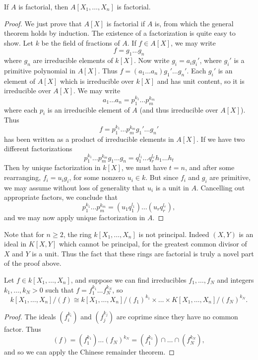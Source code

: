 \begin{corollary}
    If $A$ is factorial, then $A[X_1, \dots, X_n]$ is factorial.
\end{corollary}
\begin{proof}
    We just prove that $A[X]$ is factorial if $A$ is, from which the general theorem holds by induction. The existence of a factorization is quite easy to show. Let $k$ be the field of fractions of $A$. If $f \in A[X]$, we may write
    \[ f = g_1 \dots g_n \]
    where $g_n$ are irreducible elements of $k[X]$. Now write $g_i = a_i g_i'$, where $g_i'$ is a primitive polynomial in $A[X]$. Thus $f = (a_1 \dots a_n) g_1' \dots g_n'$. Each $g_i'$ is an element of $A[X]$ which is irreducible over $k[X]$ and has unit content, so it is irreducible over $A[X]$. We may write
    \[ a_1 \dots a_n = p_1^{k_1} \dots p_m^{k_m} \]
    where each $p_i$ is an irreducible element of $A$ (and thus irreducible over $A[X]$). Thus
    \[ f = p_1^{k_1} \dots p_m^{k_m} g_1' \dots g_n' \]
    has been written as a product of irreducible elements in $A[X]$. If we have two different factorizations
    \[ p_1^{k_1} \dots p_m^{k_m}  g_1 \dots g_n = q_1^{l_1} \dots q_r^{l_r} h_1 \dots h_t \]
    Then by unique factorization in $k[X]$, we must have $t = n$, and after some rearranging, $f_i = u_i g_i$, for some nonzero $u_i \in k$. But since $f_i$ and $g_i$ are primitive, we may assume without loss of generality that $u_i$ is a unit in $A$. Cancelling out appropriate factors, we conclude that
    \[ p_1^{k_1} \dots p_m^{k_m} = (u_1 q_1^{l_1}) \dots (u_r q_r^{l_r}), \]
    and we may now apply unique factorization in $A$.
\end{proof}

Note that for $n \geq 2$, the ring $k[X_1, \dots, X_n]$ is not principal. Indeed $(X,Y)$ is an ideal in $K[X,Y]$ which cannot be principal, for the greatest common divisor of $X$ and $Y$ is a unit. Thus the fact that these rings are factorial is truly a novel part of the proof above.

\begin{corollary}
    Let $f \in k[X_1, \dots, X_n]$, and suppose we can find irreducibles $f_1, \dots, f_N$ and integers $k_1, \dots, k_N > 0$ such that $f = f_1^{k_1} \dots f_N^{k_N}$, so
    \[ k[X_1,\dots,X_n] / (f) \cong k[X_1,\dots,X_n] / (f_1)^{k_1} \times \dots \times K[X_1,\dots,X_n] / (f_N)^{k_N}. \]
\end{corollary}
\begin{proof}
    The ideals $(f_i^{k_i})$ and $(f_j^{k_j})$ are coprime since they have no common factor. Thus
    \[ (f) = (f_1^{k_1}) \dots (f_N)^{k_N} = (f_1^{k_1}) \cap \dots \cap (f_N^{k_N}), \]
    and so we can apply the Chinese remainder theorem.
\end{proof}





